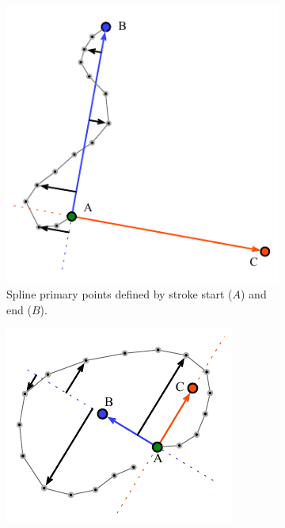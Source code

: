 \begin{figure}
  \centering
  \begin{subfigure}[t]{0.42\textwidth}
    \centering
    \includegraphics[width=\linewidth]{img/barycentric-spline.pdf}
    \caption{Spline primary points defined by stroke start ($A$) and
      end ($B$).}
    \label{fig:barycentric-spline}
  \end{subfigure}
  \hspace{1cm} %
  \begin{subfigure}[t]{0.42\textwidth}
    \centering
    \includegraphics[width=\linewidth]{img/barycentric-blob.pdf}

\end{subfigure}
\end{figure}
